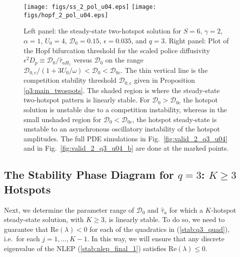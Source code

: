 \documentclass{article}%
\begin{document}
\begin{figure}[htbp]
\centering
\texttt{[image: figs/ss\_2\_pol\_u04.eps]}
\texttt{[image: figs/hopf\_2\_pol\_u04.eps]}
\caption{\label{fig:hopf_pol_2} Left panel: the steady-state
  two-hotspot solution for $S=6$, $\gamma=2$, $\alpha=1$, $U_0=4$,
  ${\mathcal D}_0=0.15$, $\epsilon=0.035$, and $q=3$. Right panel:
  Plot of the Hopf bifurcation threshold for the scaled police
  diffusivity $\epsilon^{2}D_p\equiv {{\mathcal
      D}_0/\hat{\tau}_{uH_1}}$ versus ${\mathcal D}_0$ on the range
  ${{\mathcal D}_{0,c}/(1+{3U_0/\omega})} <{\mathcal D}_0<{\mathcal
    D}_{0c}$. The thin vertical line is the competition stability
  threshold ${\mathcal D}_{0,c}$ given in Proposition
  \ref{q3:main_twospots}. The shaded region is where the steady-state
  two-hotspot pattern is linearly stable. For ${\mathcal
    D}_0>{\mathcal D}_{0c}$ the hotspot solution is unstable due to a
  competition instability, whereas in the small unshaded region for
  ${\mathcal D}_0<{\mathcal D}_{0c}$, the hotspot steady-state is
  unstable to an asynchronous oscillatory instability of the hotspot
  amplitudes. The full PDE simulations in
  Fig.~\ref{fig:valid_2_q3_u04} and in Fig.~\ref{fig:valid_2_q3_u04_b}
  are done at the marked points.}
\end{figure}




\subsection{The Stability Phase Diagram for $q=3$: $K\geq 3$ Hotspots}
\label{sect:q3_phase}

Next, we determine the parameter range of ${\mathcal D}_0$ and
$\hat{\tau}_u$ for which a $K$-hotspot steady-state solution, with
$K\geq 3$, is linearly stable. To do so, we need to guarantee that
$\mbox{Re}(\lambda)<0$ for each of the quadratics in
(\ref{stab:q3_quad}), i.e.~for each $j=1,\ldots,K-1$. In this way, we will
ensure that any discrete eigenvalue of the NLEP
(\ref{stab:nlep_final_1}) satisfies $\mbox{Re}(\lambda)\leq 0$.
\end{document}
